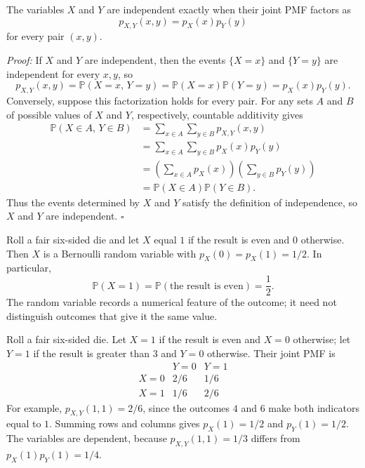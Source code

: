 \documentclass[a4paper,11pt,abstracton]{scrartcl}
\theoremstyle{dotlessP}
\theoremstyle{dotlessS}
\theoremstyle{remark}
\theoremstyle{definition}
\begin{document}
\begin{problem_box}
The variables $X$ and $Y$ are independent exactly when their joint PMF factors as
\[
  p_{X,Y}(x,y)=p_X(x)p_Y(y)
\]
for every pair $(x,y)$.
\end{problem_box}

\begin{claim_box}
\textit{Proof:}
If $X$ and $Y$ are independent, then the events $\{X=x\}$ and $\{Y=y\}$ are independent for every $x,y$, so
\[
  p_{X,Y}(x,y)=\mathbb{P}(X=x,\,Y=y)
  =\mathbb{P}(X=x)\mathbb{P}(Y=y)=p_X(x)p_Y(y).
\]
Conversely, suppose this factorization holds for every pair. For any sets $A$ and $B$ of possible values of $X$ and $Y$, respectively, countable additivity gives
\[
\begin{aligned}
  \mathbb{P}(X\in A,\,Y\in B)
  &=\sum_{x\in A}\sum_{y\in B}p_{X,Y}(x,y)\\
  &=\sum_{x\in A}\sum_{y\in B}p_X(x)p_Y(y)\\
  &=\left(\sum_{x\in A}p_X(x)\right)
    \left(\sum_{y\in B}p_Y(y)\right)\\
  &=\mathbb{P}(X\in A)\mathbb{P}(Y\in B).
\end{aligned}
\]
Thus the events determined by $X$ and $Y$ satisfy the definition of independence, so $X$ and $Y$ are independent.
\hfill$\square$
\end{claim_box}

\begin{example_box}
Roll a fair six-sided die and let $X$ equal $1$ if the result is even and $0$ otherwise. Then $X$ is a Bernoulli random variable with $p_X(0)=p_X(1)=1/2$. In particular,
\[
  \mathbb{P}(X=1)=\mathbb{P}(\text{the result is even})=\frac12.
\]
The random variable records a numerical feature of the outcome; it need not distinguish outcomes that give it the same value.
\end{example_box}

\begin{example_box}
Roll a fair six-sided die. Let $X=1$ if the result is even and $X=0$ otherwise; let $Y=1$ if the result is greater than $3$ and $Y=0$ otherwise. Their joint PMF is
\[
\begin{array}{c|cc}
  &Y=0&Y=1\\\hline
X=0&2/6&1/6\\
X=1&1/6&2/6
\end{array}
\]
For example, $p_{X,Y}(1,1)=2/6$, since the outcomes $4$ and $6$ make both indicators equal to $1$. Summing rows and columns gives $p_X(1)=1/2$ and $p_Y(1)=1/2$. The variables are dependent, because $p_{X,Y}(1,1)=1/3$ differs from $p_X(1)p_Y(1)=1/4$.
\end{example_box}
\end{document}
